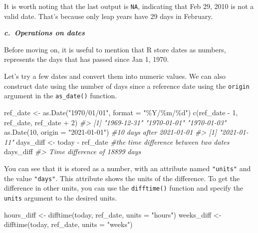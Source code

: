 \documentclass[
]{book}
\newenvironment{Shaded}{\begin{snugshade}}{\end{snugshade}}
\newcommand{\AttributeTok}[1]{\textcolor[rgb]{0.77,0.63,0.00}{#1}}
\newcommand{\CommentTok}[1]{\textcolor[rgb]{0.56,0.35,0.01}{\textit{#1}}}
\newcommand{\DecValTok}[1]{\textcolor[rgb]{0.00,0.00,0.81}{#1}}
\newcommand{\FunctionTok}[1]{\textcolor[rgb]{0.00,0.00,0.00}{#1}}
\newcommand{\NormalTok}[1]{#1}
\newcommand{\OtherTok}[1]{\textcolor[rgb]{0.56,0.35,0.01}{#1}}
\newcommand{\SpecialCharTok}[1]{\textcolor[rgb]{0.00,0.00,0.00}{#1}}
\newcommand{\StringTok}[1]{\textcolor[rgb]{0.31,0.60,0.02}{#1}}
\begin{document}
It is worth noting that the last output is \texttt{NA}, indicating that Feb 29, 2010 is not a valid date. That's because only leap years have 29 days in February.

\textbf{\emph{c.~Operations on dates}}

Before moving on, it is useful to mention that R store dates as numbers, represents the days that has passed since Jan 1, 1970.

Let's try a few dates and convert them into numeric values. We can also construct date using the number of days since a reference date using the \texttt{origin} argument in the \texttt{as\_date()} function.

\begin{Shaded}
\begin{Highlighting}[]
\NormalTok{ref\_date }\OtherTok{\textless{}{-}} \FunctionTok{as.Date}\NormalTok{(}\StringTok{"1970/01/01"}\NormalTok{, }\AttributeTok{format =} \StringTok{"\%Y/\%m/\%d"}\NormalTok{)}
\FunctionTok{c}\NormalTok{(ref\_date }\SpecialCharTok{{-}} \DecValTok{1}\NormalTok{, ref\_date, ref\_date }\SpecialCharTok{+} \DecValTok{2}\NormalTok{)}
\CommentTok{\#\textgreater{} [1] "1969{-}12{-}31" "1970{-}01{-}01" "1970{-}01{-}03"}
\FunctionTok{as.Date}\NormalTok{(}\DecValTok{10}\NormalTok{, }\AttributeTok{origin =} \StringTok{"2021{-}01{-}01"}\NormalTok{) }\CommentTok{\#10 days after 2021{-}01{-}01}
\CommentTok{\#\textgreater{} [1] "2021{-}01{-}11"}
\NormalTok{days\_diff }\OtherTok{\textless{}{-}}\NormalTok{ today }\SpecialCharTok{{-}}\NormalTok{ ref\_date           }\CommentTok{\#the time difference between two dates}
\NormalTok{days\_diff}
\CommentTok{\#\textgreater{} Time difference of 18899 days}
\end{Highlighting}
\end{Shaded}

You can see that it is stored as a number, with an attribute named \texttt{"units"} and the value \texttt{"days"}. This attribute shows the units of the difference. To get the difference in other units, you can use the \texttt{difftime()} function and specify the \texttt{units} argument to the desired units.

\begin{Shaded}
\begin{Highlighting}[]
\NormalTok{hours\_diff }\OtherTok{\textless{}{-}} \FunctionTok{difftime}\NormalTok{(today, ref\_date, }\AttributeTok{units =} \StringTok{"hours"}\NormalTok{)}
\NormalTok{weeks\_diff }\OtherTok{\textless{}{-}} \FunctionTok{difftime}\NormalTok{(today, ref\_date, }\AttributeTok{units =} \StringTok{"weeks"}\NormalTok{)}
\end{Highlighting}
\end{Shaded}
\end{document}
